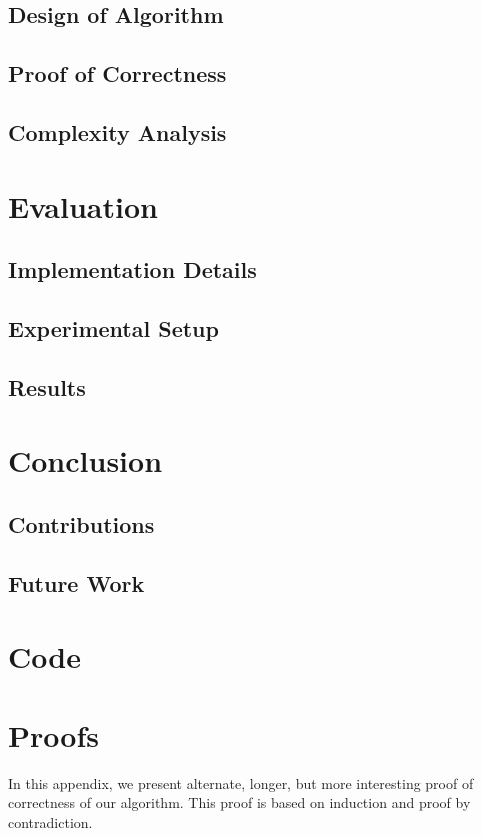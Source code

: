 \documentclass[fyp,12pt]{socreport}
\begin{document}
\section{Design of Algorithm}
\section{Proof of Correctness}
\section{Complexity Analysis}

\chapter{Evaluation}
\section{Implementation Details}
\section{Experimental Setup}
\section{Results}

\chapter{Conclusion}
\section{Contributions}
\section{Future Work}




\appendix
\chapter{Code}

\chapter{Proofs}
In this appendix, we present alternate, longer, but more interesting proof 
of correctness of our algorithm.  This proof is based on induction and proof
by contradiction.
\end{document}
